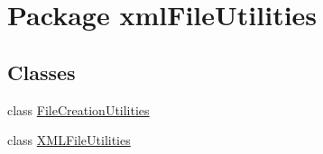 \hypertarget{namespacexmlFileUtilities}{}\section{Package xml\+File\+Utilities}
\label{namespacexmlFileUtilities}
\subsection*{Classes}
\begin{DoxyCompactItemize}
\item 
class \hyperlink{classxmlFileUtilities_1_1FileCreationUtilities}{File\+Creation\+Utilities}
\item 
class \hyperlink{classxmlFileUtilities_1_1XMLFileUtilities}{X\+M\+L\+File\+Utilities}
\end{DoxyCompactItemize}
